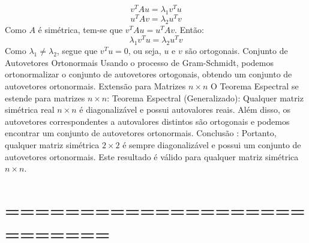 {{{\[ v^T A u = \lambda_1 v^T u \]
\[ u^T A v = \lambda_2 u^T v \]
Como \(A\) é simétrica, tem-se que \(v^T A u = u^T A v\). Então:
\[ \lambda_1 v^T u = \lambda_2 u^T v \]
Como \(\lambda_1 \neq \lambda_2\), segue que \(v^T u = 0\), ou seja, \(u\) e \(v\) são ortogonais.
Conjunto de Autovetores Ortonormais
Usando o processo de Gram-Schmidt, podemos ortonormalizar o conjunto de autovetores ortogonais, obtendo um conjunto de autovetores ortonormais.
Extensão para Matrizes \(n \times n\)
O Teorema Espectral se estende para matrizes \(n \times n\):
Teorema Espectral (Generalizado): Qualquer matriz simétrica real \(n \times n\) é diagonalizável e possui autovalores reais. Além disso, os autovetores correspondentes a autovalores distintos são ortogonais e podemos encontrar um conjunto de autovetores ortonormais.
Conclusão : Portanto, qualquer matriz simétrica \(2 \times 2\) é sempre diagonalizável e possui um conjunto de autovetores ortonormais. Este resultado é válido para qualquer matriz simétrica \(n \times n\).
\section{===========================}
}}}
